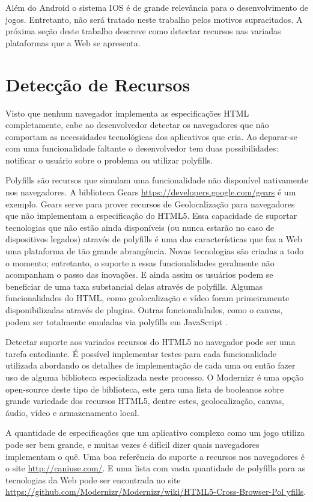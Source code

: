 Além do Android o sistema IOS é de grande relevância
para o desenvolvimento de jogos. Entretanto, não será tratado neste
trabalho pelos motivos supracitados. A próxima seção deste trabalho
descreve como detectar recursos nas variadas plataformas que a Web se
apresenta.

\section{Detecção de Recursos}
Visto que nenhum navegador implementa as especificações HTML
completamente, cabe ao desenvolvedor detectar os navegadores que não
comportam as necessidades tecnológicas dos aplicativos que cria. Ao
deparar-se com uma funcionalidade faltante o desenvolvedor tem duas
possibilidades: notificar o usuário sobre o problema ou utilizar
polyfills.

Polyfills são recursos que simulam uma funcionalidade não
disponível nativamente nos navegadores. A biblioteca Gears
\url{https://developers.google.com/gears} é um exemplo. Gears
serve para prover recursos de Geolocalização para navegadores que
não implementam a especificação do HTML5. Essa capacidade de
suportar tecnologias que não estão ainda disponíveis (ou nunca
estarão no caso de dispositivos legados) através de polyfills é
uma das características que faz a Web uma plataforma de tão grande
abrangência. Novas tecnologias são criadas a todo o momento;
entretanto, o suporte a essas funcionalidades geralmente não
acompanham o passo das inovações. E ainda assim os usuários podem
se beneficiar de uma taxa substancial delas através de polyfills.
Algumas funcionalidades do HTML, como geolocalização e vídeo
foram primeiramente disponibilizadas através de plugins. Outras
funcionalidades, como o canvas, podem ser totalmente emuladas via
polyfills em JavaScript \autocite{diveIntohtml}.

Detectar suporte aos variados recursos do HTML5 no navegador
pode ser uma tarefa entediante. É possível implementar testes para
cada funcionalidade utilizada abordando os detalhes de implementação
de cada uma ou então fazer uso de alguma biblioteca especializada
neste processo. O Modernizr é uma opção open-source deste tipo de
biblioteca, este gera uma lista de booleanos sobre grande variedade dos
recursos HTML5, dentre estes, geolocalização, canvas, áudio, vídeo e
armazenamento local.

A quantidade de especificações que um aplicativo complexo
como um jogo utiliza pode ser bem grande, e muitas vezes é
difícil dizer quais navegadores implementam o quê. Uma
boa referência do suporte a recursos nos navegadores é o site
\url{http://caniuse.com/}. E uma lista com vasta quantidade de
polyfills para as tecnologias da Web pode ser encontrada no site
\url{https://github.com/Modernizr/Modernizr/wiki/HTML5-Cross-Browser-Pol
yfills}.

